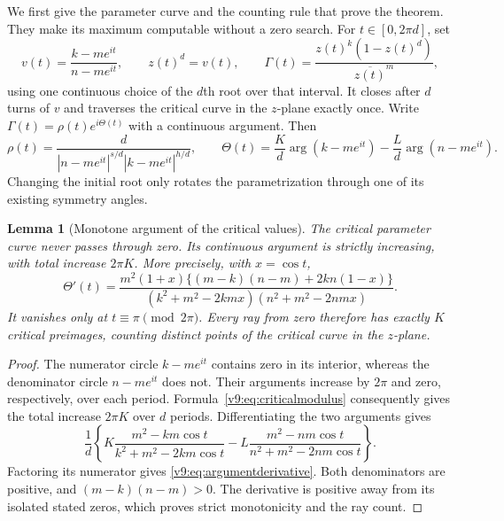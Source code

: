 \documentclass[UTF8,11pt]{ctexart}
\newtheorem{lem}[thm]{Lemma}
\theoremstyle{definition}
\numberwithin{equation}{section}
\begin{document}
We first give the parameter curve and the counting rule that prove
the theorem. They make its maximum computable without a zero search.
For $t\in[0,2\pi d]$, set
\begin{equation}\label{v9:eq:criticalparameter}
 v(t)=\frac{k-me^{it}}{n-me^{it}},\qquad z(t)^d=v(t),\qquad
 \Gamma(t)=\frac{z(t)^k(1-z(t)^d)}{\overline{z(t)}^{m}},
\end{equation}
using one continuous choice of the $d$th root over that interval.
It closes after $d$ turns of $v$ and traverses the critical curve
in the $z$-plane exactly once. Write
$\Gamma(t)=\rho(t)e^{i\Theta(t)}$ with a continuous argument.
Then
\begin{equation}\label{v9:eq:criticalmodulus}
 \rho(t)=\frac{d}
 {|n-me^{it}|^{s/d}|k-me^{it}|^{h/d}},
 \qquad
 \Theta(t)=\frac Kd\arg(k-me^{it})-\frac Ld\arg(n-me^{it}).
\end{equation}
Changing the initial root only rotates the parametrization through
one of its existing symmetry angles.

\begin{lem}[Monotone argument of the critical values]
\label{v9:lem:monotoneargument}
The critical parameter curve never passes through zero. Its continuous
argument is strictly increasing, with total increase $2\pi K$.
More precisely, with $x=\cos t$,
\begin{equation}\label{v9:eq:argumentderivative}
 \Theta'(t)=
 \frac{m^2(1+x)\{(m-k)(n-m)+2kn(1-x)\}}
 {(k^2+m^2-2kmx)(n^2+m^2-2nmx)}.
\end{equation}
It vanishes only at $t\equiv\pi\pmod{2\pi}$.
Every ray from zero therefore has exactly $K$ critical preimages,
counting distinct points of the critical curve in the $z$-plane.
\end{lem}
\begin{proof}
The numerator circle $k-me^{it}$ contains zero in its interior,
whereas the denominator circle $n-me^{it}$ does not.
Their arguments increase by $2\pi$ and zero, respectively, over
each period. Formula~\eqref{v9:eq:criticalmodulus} consequently gives
the total increase $2\pi K$ over $d$ periods.
Differentiating the two arguments gives
\[
 \frac1d\left\{
 K\frac{m^2-km\cos t}{k^2+m^2-2km\cos t}
 -L\frac{m^2-nm\cos t}{n^2+m^2-2nm\cos t}\right\}.
\]
Factoring its numerator gives \eqref{v9:eq:argumentderivative}.
Both denominators are positive, and $(m-k)(n-m)>0$.
The derivative is positive away from its isolated stated zeros,
which proves strict monotonicity and the ray count.
\end{proof}
\end{document}
